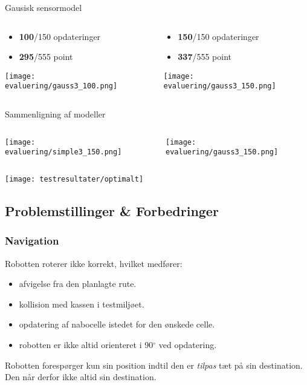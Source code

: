 \begin{frame}[fragile]{Gausisk sensormodel}
	\begin{columns}
		\begin{column}{0.5\textwidth}
			\begin{itemize}
			\item \textbf{100}/150 opdateringer
			\item \textbf{295}/555 point
			\end{itemize}
			\texttt{[image: evaluering/gauss3\_100.png]}
		\end{column}
		{\begin{column}{0.5\textwidth}
			\begin{itemize}
			\item \textbf{150}/150 opdateringer
			\item \textbf{337}/555 point
			\end{itemize}
			\texttt{[image: evaluering/gauss3\_150.png]}
		\end{column}}
\end{columns}
\end{frame}

\begin{frame}[fragile]{Sammenligning af modeller}
	\begin{columns}
		\begin{column}{0.45\textwidth}
			\texttt{[image: evaluering/simple3\_150.png]}
		\end{column}
		\begin{column}{0.45\textwidth}
			\texttt{[image: evaluering/gauss3\_150.png]}
		\end{column}
	\end{columns}
	\vspace{-0.5em}
	\begin{center}
	\texttt{[image: testresultater/optimalt]}
	\end{center}
\end{frame}

\subsection{Problemstillinger \& Forbedringer}

\begin{frame}
\frametitle{Navigation}
Robotten roterer ikke korrekt, hvilket medfører:
\begin{itemize}
\item afvigelse fra den planlagte rute.
\item kollision med kassen i testmiljøet.
\item opdatering af nabocelle istedet for den ønskede celle.
\item robotten er ikke altid orienteret i 90$^\circ$ ved opdatering.
\end{itemize}
\pause
Robotten forespørger kun sin position indtil den er \textit{tilpas} tæt på sin destination.
Den når derfor ikke altid sin destination.
\end{frame}

